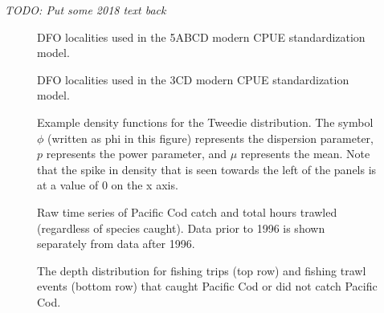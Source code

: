 \documentclass[11pt]{book}
\begin{document}
\emph{TODO: Put some 2018 text back}
\begin{figure}[htb]

{\centering {} 

}

\caption{DFO localities used in the 5ABCD modern CPUE standardization model.}\label{fig:cpue-locality-map-5}
\end{figure}
\begin{figure}[htb]

{\centering {} 

}

\caption{DFO localities used in the 3CD modern CPUE standardization model.}\label{fig:cpue-locality-map-3}
\end{figure}
\begin{figure}[htb]

{\centering {} 

}

\caption{Example density functions for the Tweedie distribution. The symbol $\phi$ (written as phi in this figure) represents the dispersion parameter, $p$ represents the power parameter, and $\mu$ represents the mean. Note that the spike in density that is seen towards the left of the panels is at a value of 0 on the x axis.}\label{fig:cpue-tweedie-ex}
\end{figure}
\begin{figure}[htb]

{\centering {} 

}

\caption{Raw time series of Pacific Cod catch and total hours trawled (regardless of species caught). Data prior to 1996 is shown separately from data after 1996.}\label{fig:cpue-catch-effort-ts}
\end{figure}
\begin{figure}[htb]

{\centering {} 

}

\caption{The depth distribution for fishing trips (top row) and fishing trawl events (bottom row) that caught Pacific Cod or did not catch Pacific Cod.}\label{fig:cpue-depth-hists}
\end{figure}
\end{document}
